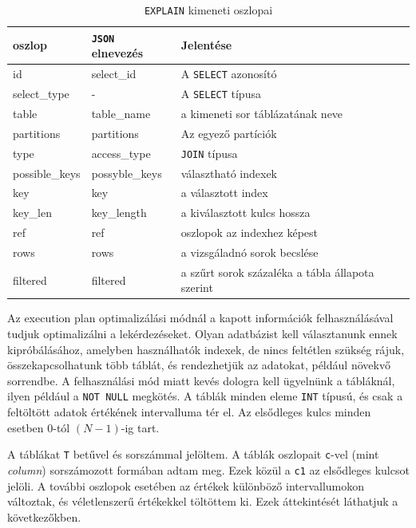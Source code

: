 \begin{table}[h!]
\centering
\caption{\texttt{EXPLAIN} kimeneti oszlopai}
\label{tab:explain}
\medskip
\begin{tabular}{|p{3cm}|p{3cm}|p{8cm}|}
\hline
oszlop & \texttt{JSON} elnevezés & Jelentése \\
\hline
id & select\_id & A \texttt{SELECT} azonosító \\
\hline
select\_type & - & A \texttt{SELECT} típusa \\
\hline
table & table\_name & a kimeneti sor táblázatának neve  \\
\hline
partitions & partitions & Az egyező partíciók \\
\hline
type & access\_type & \texttt{JOIN} típusa  \\
\hline
possible\_keys & possyble\_keys & választható indexek \\
\hline
key & key & a választott index \\
\hline
key\_len & key\_length & a kiválasztott kulcs hossza \\
\hline
ref & ref & oszlopok az indexhez képest \\
\hline
rows & rows & a vizsgáladnó sorok becslése \\
\hline
filtered & filtered & a szűrt sorok százaléka a tábla állapota szerint \\
\hline
\end{tabular}
\end{table}


Az execution plan optimalizálási módnál a kapott információk felhasználásával tudjuk optimalizálni a lekérdezéseket.
Olyan adatbázist kell választanunk ennek kipróbálásához, amelyben használhatók indexek, de nincs feltétlen szükség rájuk, összekapcsolhatunk több táblát, és rendezhetjük az adatokat, például növekvő sorrendbe. A felhasználási mód miatt kevés dologra kell ügyelnünk a tábláknál, ilyen például a \texttt{NOT NULL} megkötés. A táblák minden eleme \texttt{INT} típusú, és csak a feltöltött adatok értékének intervalluma tér el. Az elsődleges kulcs minden esetben 0-tól $(N-1)$-ig tart.

A táblákat \texttt{T} betűvel és sorszámmal jelöltem. A táblák oszlopait \texttt{c}-vel (mint \textit{column}) sorszámozott formában adtam meg. Ezek közül a \texttt{c1} az elsődleges kulcsot jelöli. A további oszlopok esetében az értékek különböző intervallumokon változtak, és véletlenszerű értékekkel töltöttem ki. Ezek áttekintését láthatjuk a következőkben.

